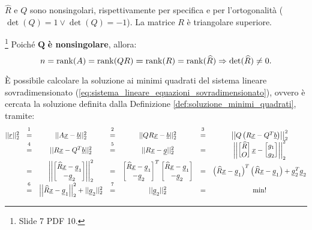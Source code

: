 $\widehat R$ e $Q$ sono nonsingolari, rispettivamente per specifica e per l'ortogonalità ($\det(Q)=1\vee \det(Q)=-1$). La matrice $R$ è triangolare superiore.

\begin{remark}\label{rem:fattQRNonSing}\footnote{Slide 7 PDF 10.}
    Poiché $\boldsymbol Q$ \textbf{è \gls{nonsingolare}}, allora:
    \begin{equation*}
        n = \operatorname{rank}(A) = \operatorname{rank} (QR) \boldsymbol = \operatorname{rank}(R) = \operatorname{rank}(\widehat R)\Rightarrow \det(\widehat R)\neq 0.
    \end{equation*}
\end{remark}

È possibile calcolare la soluzione ai minimi quadrati del sistema lineare sovradimensionato (\ref{eq:sistema_lineare_equazioni_sovradimensionato}), ovvero è cercata la soluzione definita dalla Definizione \ref{def:soluzione_minimi_quadrati}, tramite:
\begin{equation}\label{eq:norma_2_residuo_minimo}
    \begin{matrix}
        ||\uline r||_2^2 &\overset{\footnotemark}{=}& ||A\uline x-\uline b||_2^2 &\overset{\footnotemark}{=}&||QR\uline x-\uline b||_2^2 &\overset{\footnotemark}{=}& \left|\left|Q\left(R\uline x-Q^T\uline b\right)\right|\right|_2^2\\
        &\overset{\footnotemark}{=}& ||R\uline x-Q^T\uline b||_2^2 &\overset{\footnotemark}{=}& ||R\uline x - \uline g||_2^2 &=& 
        \left|\left|\begin{bmatrix}
            \widehat R\\
            O
        \end{bmatrix}\uline x - 
        \begin{bmatrix}
            g_1\\
            g_2
        \end{bmatrix}\right|\right|_2^2\\
        &=& \left|\left|\begin{bmatrix}
            \widehat R\uline x-\uline g_1\\
            -\uline g_2
        \end{bmatrix}\right|\right|_2^2 &=&
        \begin{bmatrix}
            \widehat R\uline x-\uline g_1\\
            -\uline g_2
        \end{bmatrix}^T
        \begin{bmatrix}
            \widehat R\uline x-\uline g_1\\
            -\uline g_2
        \end{bmatrix}&=& \left(\widehat R\uline x-\uline g_1\right)^T\left(\widehat R\uline x-\uline g_1\right)+\uline g_2^T\uline g_2 \\
        &\overset{\footnotemark}{=}& \left|\left|\widehat R\uline x - \uline g_1\right|\right|_2^2+||\uline g_2||_2^2 &\overset{\footnotemark}{=}& ||\uline g_2||_2^2&=&\min !
    \end{matrix}
\end{equation}

